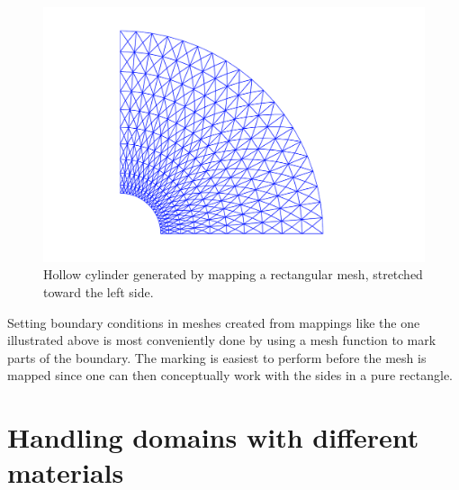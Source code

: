 \begin{figure}
\label{langtangen:mesh:transform:cyl:fig1}
 \centerline{
  \includegraphics[width=0.9\linewidth]{chapters/langtangen/pdf/hollow_cylinder.pdf}}
  \caption{
  Hollow cylinder generated by mapping a rectangular mesh, stretched toward
  the left side.
  }
\end{figure}

Setting boundary conditions in meshes created from mappings like the one
illustrated above is most conveniently done by using a mesh function
to mark parts of the boundary. The marking is easiest to perform
before the mesh is mapped since one can then conceptually work with
the sides in a pure rectangle.
%



\section{Handling domains with different materials}

